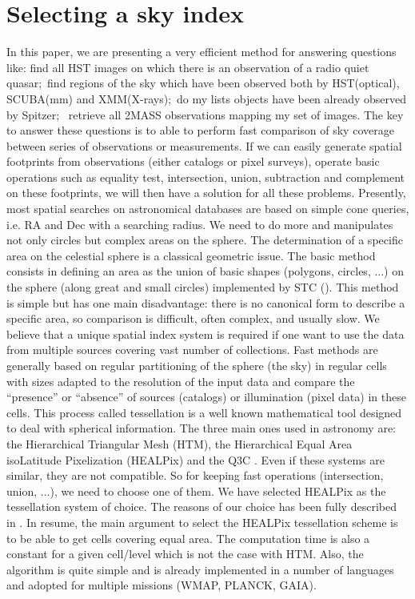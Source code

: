\documentclass[11pt,twoside]{article}
\begin{document}
\section{Selecting a sky index}
In this paper, we are presenting a very efficient method for answering questions like: find all HST images on which there is an observation of a radio quiet quasar;\ find regions of the sky which have been observed both by HST(optical), SCUBA(mm) and XMM(X-rays);\ do my lists objects have been already observed by Spitzer; \ retrieve all 2MASS observations mapping my set of images. 
The key to answer these questions is to able to perform fast comparison of sky coverage between series of observations or measurements. If we can easily generate spatial footprints from observations (either catalogs or pixel surveys), operate basic operations such as equality test, intersection, union, subtraction and complement on these footprints, we will then have a solution for all these problems. Presently, most spatial searches on astronomical databases are based on simple
cone queries, i.e. RA and Dec with a searching radius. We need to do more and manipulates not only circles but complex areas on the sphere.
The determination of a specific area on the celestial sphere is a classical geometric issue.
The basic method consists in defining an area as the union of basic shapes
(polygons, circles, ...) on the sphere (along great and small circles) implemented by STC (\cite{STC}). This method is simple but has one main disadvantage: there is no canonical form to describe a specific area, so comparison is difficult, often complex, and usually slow. We believe that a unique spatial index system is required if one want to use the data from multiple sources covering vast number of collections. Fast methods are generally based on regular partitioning of the sphere (the sky) in regular cells with sizes adapted to the resolution of the input data and compare the ``presence'' or ``absence'' of sources (catalogs) or illumination (pixel data) in these cells.
This process called tessellation is a well known mathematical tool designed to deal with spherical information.
The three main ones used in astronomy are: the Hierarchical Triangular Mesh \cite{HTM} (HTM),
the Hierarchical Equal Area isoLatitude Pixelization \cite{Healpix} (HEALPix) and the Q3C \cite{quadtreee}. Even if these systems are similar, they are not compatible. So for keeping fast operations (intersection, union, ...), we need to choose one of them. We have selected HEALPix as the tessellation system of choice. The reasons of our choice has been fully described in  \cite{Fernique}. In resume, the main argument to select the HEALPix tessellation scheme is to be able to get cells covering equal area. The computation time is also a constant for a given cell/level which is not the case with HTM. Also, the algorithm is quite simple and is already implemented in a number of languages and adopted for multiple missions  (WMAP, PLANCK, GAIA).
\end{document}
